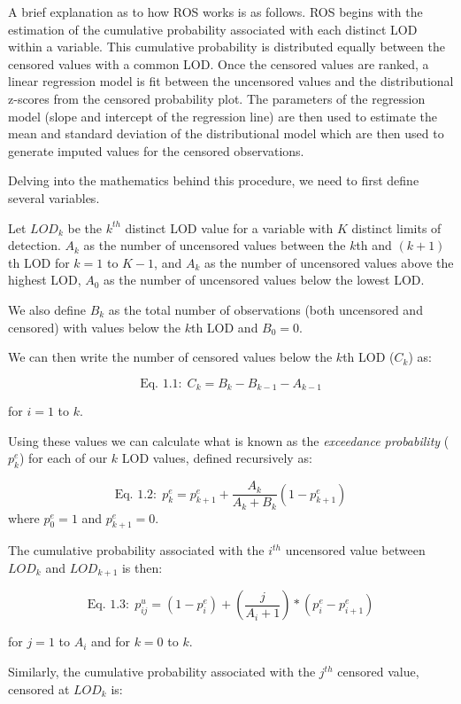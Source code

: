 \documentclass[12pt, twoside]{amherstthesis}
\begin{document}
A brief explanation as to how ROS works is as follows. ROS begins with the estimation of the cumulative probability associated with each distinct LOD within a variable. This cumulative probability is distributed equally between the censored values with a common LOD. Once the censored values are ranked, a linear regression model is fit between the uncensored values and the distributional z-scores from the censored probability plot. The parameters of the regression model (slope and intercept of the regression line) are then used to estimate the mean and standard deviation of the distributional model which are then used to generate imputed values for the censored observations.

Delving into the mathematics behind this procedure, we need to first define several variables.

Let \(LOD_k\) be the \(k^{th}\) distinct LOD value for a variable with \(K\) distinct limits of detection. \(A_k\) as the number of uncensored values between the \(k\)th and \((k+1)\)th LOD for \(k=1\) to \(K-1\), and \(A_k\) as the number of uncensored values above the highest LOD, \(A_0\) as the number of uncensored values below the lowest LOD.

We also define \(B_k\) as the total number of observations (both uncensored and censored) with values below the \(k\)th LOD and \(B_0 = 0\).

We can then write the number of censored values below the \(k\)th LOD (\(C_k\)) as:

\[\textrm{Eq. 1.1:} \ \  C_k = B_k - B_{k-1}-A_{k-1}\]

for \(i = 1\) to \(k\).

Using these values we can calculate what is known as the \emph{exceedance probability} (\(p^e_{k}\)) for each of our \(k\) LOD values, defined recursively as:

\[\textrm{Eq. 1.2:} \ \  p^e_k = p^e_{k+1} + \frac{A_k}{A_k+B_k}(1 - p^e_{k+1})\]
where \(p^e_0 = 1\) and \(p^e_{k+1} = 0\).

The cumulative probability associated with the \(i^{th}\) uncensored value between \(LOD_k\) and \(LOD_{k+1}\) is then:

\[\textrm{Eq. 1.3:} \ \  p^u_{ij} = (1-p^e_i)+ \left(\frac{j}{A_i+1}\right)*(p^e_i-p^e_{i+1})\]

for \(j = 1\) to \(A_i\) and for \(k = 0\) to \(k\).

Similarly, the cumulative probability associated with the \(j^{th}\) censored value, censored at \(LOD_k\) is:
\end{document}
